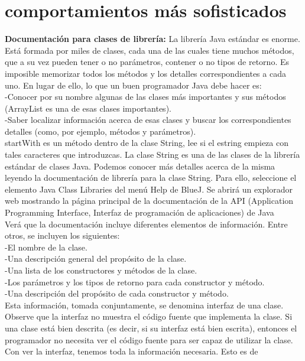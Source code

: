 \documentclass[11pt,a4paper]{article}
\begin{document}
	\section{comportamientos más sofisticados}
	\textbf{Documentación para clases de librería:} La librería Java estándar es enorme. Está formada por miles de clases, cada una de las cuales tiene
	muchos métodos, que a su vez pueden tener o no parámetros, contener o no tipos de retorno. Es
	imposible memorizar todos los métodos y los detalles correspondientes a cada uno. En lugar de
	ello, lo que un buen programador Java debe hacer es:\\
	-Conocer por su nombre algunas de las clases más importantes y sus métodos (ArrayList es
	una de esas clases importantes).\\
	-Saber localizar información acerca de esas clases y buscar los correspondientes detalles (como,
	por ejemplo, métodos y parámetros).
	\\
	startWith es un método dentro de la clase String, lee si el estring empieza con tales caracteres que introduzcas. La clase String es una de las clases de la librería estándar de clases Java. Podemos conocer más
	detalles acerca de la misma leyendo la documentación de librería para la clase String.
	Para ello, seleccione el elemento Java Class Libraries del menú Help de BlueJ. Se abrirá un explorador
	web mostrando la página principal de la documentación de la API (Application Programming
	Interface, Interfaz de programación de aplicaciones) de Java\\
	Verá que la documentación incluye diferentes elementos de información. Entre otros, se incluyen
	los siguientes:\\
	-El nombre de la clase.\\
	-Una descripción general del propósito de la clase.\\
	-Una lista de los constructores y métodos de la clase.\\
	-Los parámetros y los tipos de retorno para cada constructor y método.\\
	-Una descripción del propósito de cada constructor y método.\\
	Esta información, tomada conjuntamente, se denomina interfaz de una clase. Observe que la interfaz
	no muestra el código fuente que implementa la clase. Si una clase está bien descrita (es decir,
	si su interfaz está bien escrita), entonces el programador no necesita ver el código fuente para ser
	capaz de utilizar la clase. Con ver la interfaz, tenemos toda la información necesaria. Esto es de
\end{document}
